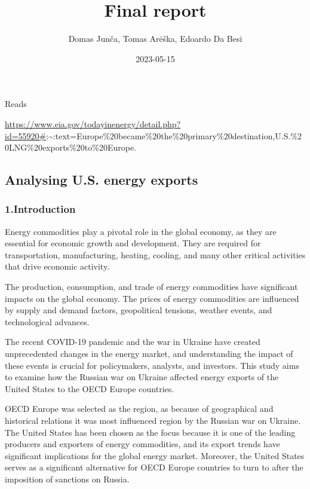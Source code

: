 \documentclass[
]{article}
\title{Final report}
\author{Domas Junča, Tomas Arėška, Edoardo Da Besi}
\date{2023-05-15}
\begin{document}
\maketitle

Reads

\url{https://www.eia.gov/todayinenergy/detail.php?id=55920\#}:\textasciitilde:text=Europe\%20became\%20the\%20primary\%20destination,U.S.\%20LNG\%20exports\%20to\%20Europe.

\hypertarget{analysing-u.s.-energy-exports}{%
\subsection{Analysing U.S. energy
exports}\label{analysing-u.s.-energy-exports}}

\hypertarget{introduction}{%
\subsubsection{1.Introduction}\label{introduction}}

Energy commodities play a pivotal role in the global economy, as they
are essential for economic growth and development. They are required for
transportation, manufacturing, heating, cooling, and many other critical
activities that drive economic activity.

The production, consumption, and trade of energy commodities have
significant impacts on the global economy. The prices of energy
commodities are influenced by supply and demand factors, geopolitical
tensions, weather events, and technological advances.

The recent COVID-19 pandemic and the war in Ukraine have created
unprecedented changes in the energy market, and understanding the impact
of these events is crucial for policymakers, analysts, and investors.
This study aims to examine how the Russian war on Ukraine affected
energy exports of the United States to the OECD Europe countries.

OECD Europe was selected as the region, as because of geographical and
historical relations it was most influenced region by the Russian war on
Ukraine. The United States has been chosen as the focus because it is
one of the leading producers and exporters of energy commodities, and
its export trends have significant implications for the global energy
market. Moreover, the United States serves as a significant alternative
for OECD Europe countries to turn to after the imposition of sanctions
on Russia.
\end{document}
